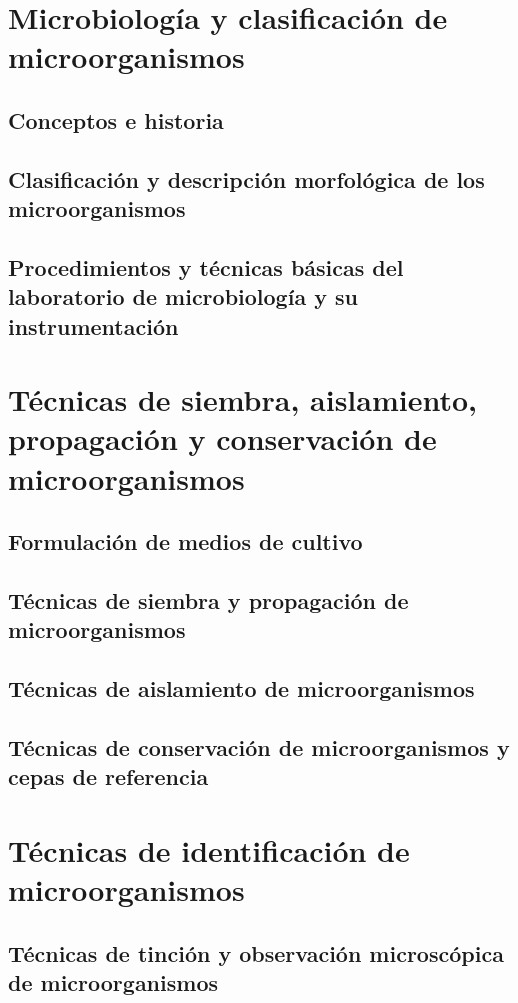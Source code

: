 \documentclass{AsignaturaResumen}
\begin{document}
    \frontmatter
    
\Portada    
\Indices

    \mainmatter
    \restoregeometry
    

\part{Microbiología y clasificación de microorganismos}
    \chapter{Conceptos e historia}
    \chapter{Clasificación y descripción morfológica de los microorganismos}
    \chapter{Procedimientos y técnicas básicas del laboratorio de microbiología y su instrumentación}

\part{Técnicas de siembra, aislamiento, propagación y conservación de microorganismos}
    \chapter{Formulación de medios de cultivo}
    \chapter{Técnicas de siembra y propagación de microorganismos}
    \chapter{Técnicas de aislamiento de microorganismos}
    \chapter{Técnicas de conservación de microorganismos y cepas de referencia}

\part{Técnicas de identificación de microorganismos}
    \chapter{Técnicas de tinción y observación microscópica de microorganismos}
\end{document}
